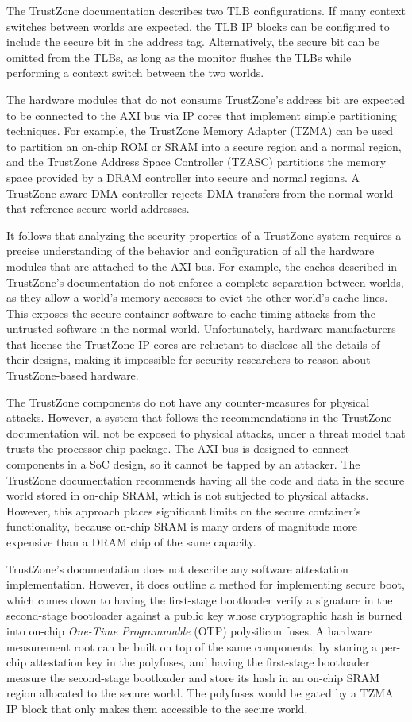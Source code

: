The TrustZone documentation describes two TLB configurations. If many context
switches between worlds are expected, the TLB IP blocks can be configured to
include the secure bit in the address tag. Alternatively, the secure bit can be
omitted from the TLBs, as long as the monitor flushes the TLBs while
performing a context switch between the two worlds.

The hardware modules that do not consume TrustZone's address bit are expected
to be connected to the AXI bus via IP cores that implement simple partitioning
techniques. For example, the TrustZone Memory Adapter (TZMA) can be used to
partition an on-chip ROM or SRAM into a secure region and a normal region, and
the TrustZone Address Space Controller (TZASC) partitions the memory space
provided by a DRAM controller into secure and normal regions. A TrustZone-aware
DMA controller rejects DMA transfers from the normal world that reference
secure world addresses.

It follows that analyzing the security properties of a TrustZone system
requires a precise understanding of the behavior and configuration of all the
hardware modules that are attached to the AXI bus. For example, the caches
described in TrustZone's documentation do not enforce a complete separation
between worlds, as they allow a world's memory accesses to evict the other
world's cache lines. This exposes the secure container software to cache timing
attacks from the untrusted software in the normal world. Unfortunately,
hardware manufacturers that license the TrustZone IP cores are reluctant to
disclose all the details of their designs, making it impossible for security
researchers to reason about TrustZone-based hardware.

The TrustZone components do not have any counter-measures for physical attacks.
However, a system that follows the recommendations in the TrustZone
documentation will not be exposed to physical attacks, under a threat model
that trusts the processor chip package. The AXI bus is designed to connect
components in a SoC design, so it cannot be tapped by an attacker. The
TrustZone documentation recommends having all the code and data in the secure
world stored in on-chip SRAM, which is not subjected to physical attacks.
However, this approach places significant limits on the secure container's
functionality, because on-chip SRAM is many orders of magnitude more expensive
than a DRAM chip of the same capacity.

TrustZone's documentation does not describe any software attestation
implementation. However, it does outline a method for implementing secure boot,
which comes down to having the first-stage bootloader verify a signature in the
second-stage bootloader against a public key whose cryptographic hash is burned
into on-chip \textit{One-Time Programmable} (OTP) polysilicon fuses. A hardware
measurement root can be built on top of the same components, by storing a
per-chip attestation key in the polyfuses, and having the first-stage
bootloader measure the second-stage bootloader and store its hash in an on-chip
SRAM region allocated to the secure world. The polyfuses would be gated by a
TZMA IP block that only makes them accessible to the secure world.
